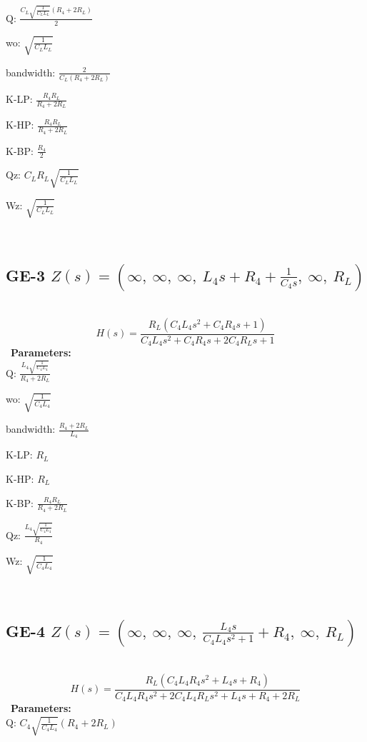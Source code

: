 \documentclass{article}
\begin{document}
Q: $\frac{C_{L} \sqrt{\frac{1}{C_{L} L_{L}}} \left(R_{4} + 2 R_{L}\right)}{2}$\ 

wo: $\sqrt{\frac{1}{C_{L} L_{L}}}$\ 

bandwidth: $\frac{2}{C_{L} \left(R_{4} + 2 R_{L}\right)}$\ 

K-LP: $\frac{R_{4} R_{L}}{R_{4} + 2 R_{L}}$\ 

K-HP: $\frac{R_{4} R_{L}}{R_{4} + 2 R_{L}}$\ 

K-BP: $\frac{R_{4}}{2}$\ 

Qz: $C_{L} R_{L} \sqrt{\frac{1}{C_{L} L_{L}}}$\ 

Wz: $\sqrt{\frac{1}{C_{L} L_{L}}}$\ 

\ 

\subsection{GE-3 $Z(s) = \left( \infty, \  \infty, \  \infty, \  L_{4} s + R_{4} + \frac{1}{C_{4} s}, \  \infty, \  R_{L}\right)$ } \ 
\textbf{\[H(s) = \frac{R_{L} \left(C_{4} L_{4} s^{2} + C_{4} R_{4} s + 1\right)}{C_{4} L_{4} s^{2} + C_{4} R_{4} s + 2 C_{4} R_{L} s + 1}\] } \ 
\textbf{Parameters:}\\ 

Q: $\frac{L_{4} \sqrt{\frac{1}{C_{4} L_{4}}}}{R_{4} + 2 R_{L}}$\ 

wo: $\sqrt{\frac{1}{C_{4} L_{4}}}$\ 

bandwidth: $\frac{R_{4} + 2 R_{L}}{L_{4}}$\ 

K-LP: $R_{L}$\ 

K-HP: $R_{L}$\ 

K-BP: $\frac{R_{4} R_{L}}{R_{4} + 2 R_{L}}$\ 

Qz: $\frac{L_{4} \sqrt{\frac{1}{C_{4} L_{4}}}}{R_{4}}$\ 

Wz: $\sqrt{\frac{1}{C_{4} L_{4}}}$\ 

\ 

\subsection{GE-4 $Z(s) = \left( \infty, \  \infty, \  \infty, \  \frac{L_{4} s}{C_{4} L_{4} s^{2} + 1} + R_{4}, \  \infty, \  R_{L}\right)$ } \ 
\textbf{\[H(s) = \frac{R_{L} \left(C_{4} L_{4} R_{4} s^{2} + L_{4} s + R_{4}\right)}{C_{4} L_{4} R_{4} s^{2} + 2 C_{4} L_{4} R_{L} s^{2} + L_{4} s + R_{4} + 2 R_{L}}\] } \ 
\textbf{Parameters:}\\ 

Q: $C_{4} \sqrt{\frac{1}{C_{4} L_{4}}} \left(R_{4} + 2 R_{L}\right)$\ 
\end{document}
